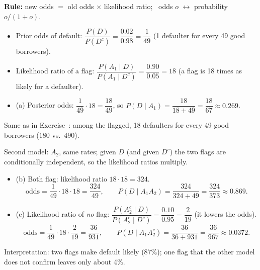 \begin{slides}
	\small
	\exstatement
	\pause
	\sol \textbf{Rule:} new odds $=$ old odds $\times$ likelihood ratio;
	\ odds $o$ $\leftrightarrow$ probability $o/(1+o)$.
	\pause
	\begin{itemize}
		\item Prior odds of default:
		      $\dfrac{P(D)}{P(D^c)}=\dfrac{0.02}{0.98}=\dfrac{1}{49}$
		      \quad (1 defaulter for every 49 good borrowers).
		      \pause
		\item Likelihood ratio of a flag:
		      $\dfrac{P(A_1\mid D)}{P(A_1\mid D^c)}=\dfrac{0.90}{0.05}=18$
		      \quad (a flag is 18 times as likely for a defaulter).
		      \pause
		\item (a) Posterior odds: $\dfrac{1}{49}\cdot18=\dfrac{18}{49}$,
		      \quad so
		      $P(D\mid A_1)=\dfrac{18}{18+49}=\dfrac{18}{67}\approx0.269$.
	\end{itemize}
	\pause
	Same as in Exercise~: among the flagged, 18
	defaulters for every 49 good borrowers ($180$ vs.\ $490$).
\end{slides}

\begin{slides}
	\small
	Second model: $A_2$, same rates; given $D$ (and given $D^c$) the two flags
	are conditionally independent, so the likelihood ratios \alert{multiply}.
	\pause
	\begin{itemize}
		\item (b) Both flag: likelihood ratio $18\cdot18=324$.
		      \[ \text{odds}=\frac{1}{49}\cdot18\cdot18=\frac{324}{49},\qquad
			      P(D\mid A_1A_2)=\frac{324}{324+49}=\frac{324}{373}\approx0.869. \]
		      \pause
		\item (c) Likelihood ratio of \emph{no} flag:
		      $\dfrac{P(A_2^c\mid D)}{P(A_2^c\mid D^c)}=\dfrac{0.10}{0.95}
			      =\dfrac{2}{19}$ \quad (it lowers the odds).
		      \pause
		      \[ \text{odds}=\frac{1}{49}\cdot18\cdot\frac{2}{19}=\frac{36}{931},
			      \qquad P(D\mid A_1A_2^c)=\frac{36}{36+931}=\frac{36}{967}
			      \approx0.0372. \]
		      \pause
	\end{itemize}
	\alert{Interpretation:} two flags make default likely (87\%); one flag
	that the other model does not confirm leaves only about 4\%.
\end{slides}

